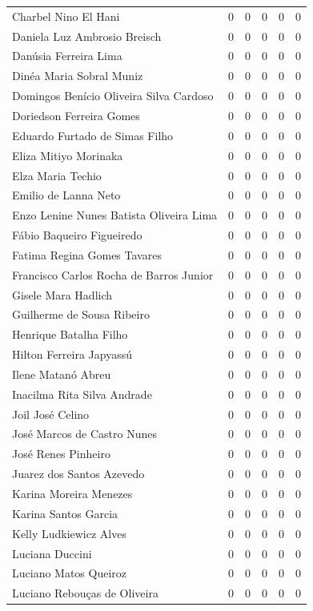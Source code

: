 \documentclass[12pt,brazil]{article}\usepackage[]{graphicx}\usepackage[]{xcolor}
\begin{document}
\begin{longtable}{lrrrrr}
Charbel Nino El Hani & 0 & 0 & 0 & 0 & 0 \\
Daniela Luz Ambrosio Breisch & 0 & 0 & 0 & 0 & 0 \\
Danúsia Ferreira Lima & 0 & 0 & 0 & 0 & 0 \\
Dinéa Maria Sobral Muniz & 0 & 0 & 0 & 0 & 0 \\
Domingos Benício Oliveira Silva Cardoso & 0 & 0 & 0 & 0 & 0 \\
Doriedson Ferreira Gomes & 0 & 0 & 0 & 0 & 0 \\
Eduardo Furtado de Simas Filho & 0 & 0 & 0 & 0 & 0 \\
Eliza Mitiyo Morinaka & 0 & 0 & 0 & 0 & 0 \\
Elza Maria Techio & 0 & 0 & 0 & 0 & 0 \\
Emilio de Lanna Neto & 0 & 0 & 0 & 0 & 0 \\
Enzo Lenine Nunes Batista Oliveira Lima & 0 & 0 & 0 & 0 & 0 \\
Fábio Baqueiro Figueiredo & 0 & 0 & 0 & 0 & 0 \\
Fatima Regina Gomes Tavares & 0 & 0 & 0 & 0 & 0 \\
Francisco Carlos Rocha de Barros Junior & 0 & 0 & 0 & 0 & 0 \\
Gisele Mara Hadlich & 0 & 0 & 0 & 0 & 0 \\
Guilherme de Sousa Ribeiro & 0 & 0 & 0 & 0 & 0 \\
Henrique Batalha Filho & 0 & 0 & 0 & 0 & 0 \\
Hilton Ferreira Japyassú & 0 & 0 & 0 & 0 & 0 \\
Ilene Matanó Abreu & 0 & 0 & 0 & 0 & 0 \\
Inacilma Rita Silva Andrade & 0 & 0 & 0 & 0 & 0 \\
Joil José Celino & 0 & 0 & 0 & 0 & 0 \\
José Marcos de Castro Nunes & 0 & 0 & 0 & 0 & 0 \\
José Renes Pinheiro & 0 & 0 & 0 & 0 & 0 \\
Juarez dos Santos Azevedo & 0 & 0 & 0 & 0 & 0 \\
Karina Moreira Menezes & 0 & 0 & 0 & 0 & 0 \\
Karina Santos Garcia & 0 & 0 & 0 & 0 & 0 \\
Kelly Ludkiewicz Alves & 0 & 0 & 0 & 0 & 0 \\
Luciana Duccini & 0 & 0 & 0 & 0 & 0 \\
Luciano Matos Queiroz & 0 & 0 & 0 & 0 & 0 \\
Luciano Rebouças de Oliveira & 0 & 0 & 0 & 0 & 0 \\

\end{longtable}
\end{document}
